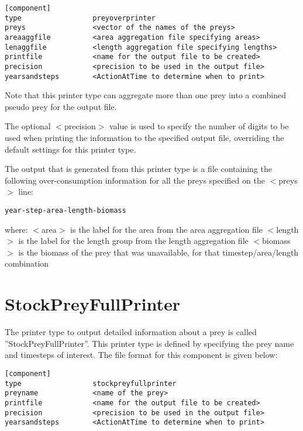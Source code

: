 \documentclass[10pt,twoside]{book}
\begin{document}
{\small\begin{verbatim}
[component]
type                 preyoverprinter
preys                <vector of the names of the preys>
areaaggfile          <area aggregation file specifying areas>
lenaggfile           <length aggregation file specifying lengths>
printfile            <name for the output file to be created>
precision            <precision to be used in the output file>
yearsandsteps        <ActionAtTime to determine when to print>
\end{verbatim}}

Note that this printer type can aggregate more than one prey into a combined pseudo prey for the output file.

\bigskip
The optional $<$precision$>$ value is used to specify the number of digits to be used when printing the information to the specified output file, overriding the default settings for this printer type.

\bigskip
The output that is generated from this printer type is a file containing the following over-consumption information for all the preys specified on the $<$preys$>$ line:

{\small\begin{verbatim}
year-step-area-length-biomass
\end{verbatim}}

where:\newline
$<$area$>$ is the label for the area from the area aggregation file\newline
$<$length$>$ is the label for the length group from the length aggregation file\newline
$<$biomass$>$ is the biomass of the prey that was unavailable, for that timestep/area/length combination

\section{StockPreyFullPrinter}\label{sec:stockpreyfullprinter}
The printer type to output detailed information about a prey is called ''StockPreyFullPrinter''.  This printer type is defined by specifying the prey name and timesteps of interest.  The file format for this component is given below:

{\small\begin{verbatim}
[component]
type                 stockpreyfullprinter
preyname             <name of the prey>
printfile            <name for the output file to be created>
precision            <precision to be used in the output file>
yearsandsteps        <ActionAtTime to determine when to print>
\end{verbatim}}
\end{document}

